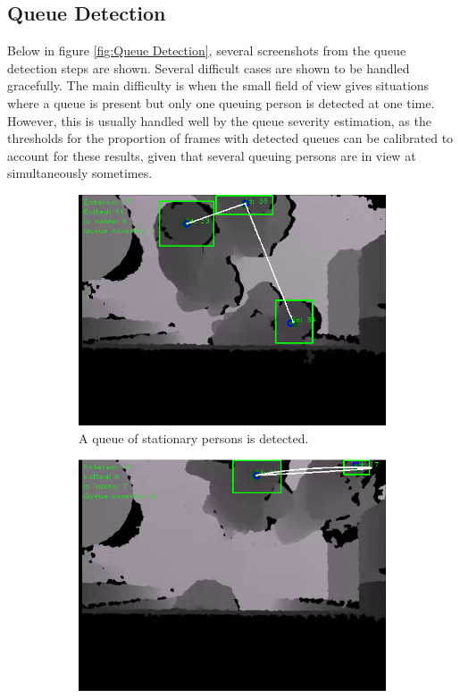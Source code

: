 \subsection{Queue Detection}
Below in figure \ref{fig:Queue Detection}, several screenshots from the queue detection steps are shown. Several difficult cases are shown to be handled gracefully. The main difficulty is when the small field of view gives situations where a queue is present but only one queuing person is detected at one time. However, this is usually handled well by the queue severity estimation, as the thresholds for the proportion of frames with detected queues can be calibrated to account for these results, given that several queuing persons are in view at simultaneously sometimes. 

\begin{figure}[H]
\centering
\begin{subfigure}{.4\textwidth}
  \centering
  \includegraphics[width=1.0\linewidth]{images/queueDetected3.png}
  \caption{A queue of stationary persons is detected.}
  \label{fig:sub1}
\end{subfigure}
\begin{subfigure}{.4\textwidth}
  \centering
  \includegraphics[width=1.0\linewidth]{images/queueDetected1.png}

\end{subfigure}
\end{figure}
